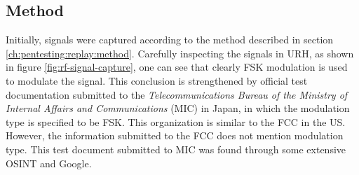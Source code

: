 \subsection{Method}
Initially, signals were captured according to the method described in section \ref{ch:pentesting:replay:method}. Carefully inspecting the signals in \gls{URH}, as shown in figure \ref{fig:rf-signal-capture}, one can see that clearly \gls{FSK} modulation is used to modulate the signal. This conclusion is strengthened by official test documentation submitted to the \textit{Telecommunications Bureau of the Ministry of Internal Affairs and Communications} (MIC) in Japan, in which the modulation type is specified to be FSK. This organization is similar to the FCC in the US. However, the information submitted to the FCC does not mention modulation type. This test document submitted to MIC was found through some extensive \gls{OSINT} and Google.

